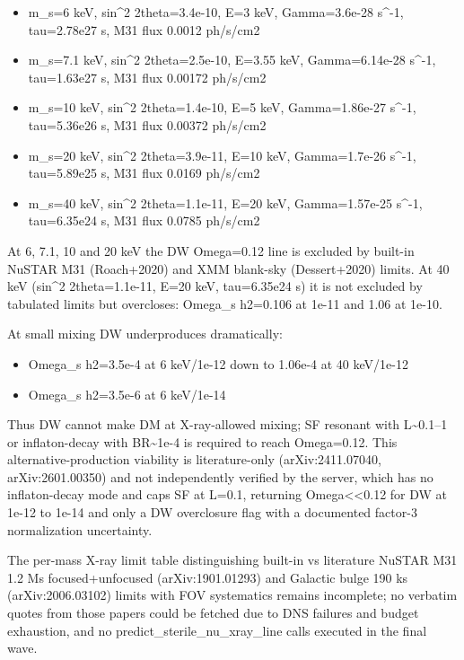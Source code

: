 \documentclass[11pt,a4paper]{article}
\begin{document}
\begin{itemize}
  \item m\_s=6 keV, sin\textasciicircum{}2 2theta=3.4e-10, E=3 keV, Gamma=3.6e-28 s\textasciicircum{}-1, tau=2.78e27 s, M31 flux 0.0012 ph/s/cm2
  \item m\_s=7.1 keV, sin\textasciicircum{}2 2theta=2.5e-10, E=3.55 keV, Gamma=6.14e-28 s\textasciicircum{}-1, tau=1.63e27 s, M31 flux 0.00172 ph/s/cm2
  \item m\_s=10 keV, sin\textasciicircum{}2 2theta=1.4e-10, E=5 keV, Gamma=1.86e-27 s\textasciicircum{}-1, tau=5.36e26 s, M31 flux 0.00372 ph/s/cm2
  \item m\_s=20 keV, sin\textasciicircum{}2 2theta=3.9e-11, E=10 keV, Gamma=1.7e-26 s\textasciicircum{}-1, tau=5.89e25 s, M31 flux 0.0169 ph/s/cm2
  \item m\_s=40 keV, sin\textasciicircum{}2 2theta=1.1e-11, E=20 keV, Gamma=1.57e-25 s\textasciicircum{}-1, tau=6.35e24 s, M31 flux 0.0785 ph/s/cm2
\end{itemize}
At 6, 7.1, 10 and 20 keV the DW Omega=0.12 line is excluded by built-in NuSTAR M31 (Roach+2020) and XMM blank-sky (Dessert+2020) limits. At 40 keV (sin\textasciicircum{}2 2theta=1.1e-11, E=20 keV, tau=6.35e24 s) it is not excluded by tabulated limits but overcloses: Omega\_s h2=0.106 at 1e-11 and 1.06 at 1e-10.

At small mixing DW underproduces dramatically:

\begin{itemize}
  \item Omega\_s h2=3.5e-4 at 6 keV/1e-12 down to 1.06e-4 at 40 keV/1e-12
  \item Omega\_s h2=3.5e-6 at 6 keV/1e-14
\end{itemize}
Thus DW cannot make DM at X-ray-allowed mixing; SF resonant with L\textasciitilde{}0.1--1 or inflaton-decay with BR\textasciitilde{}1e-4 is required to reach Omega=0.12. This alternative-production viability is literature-only (arXiv:2411.07040, arXiv:2601.00350) and not independently verified by the server, which has no inflaton-decay mode and caps SF at L=0.1, returning Omega\textless{}\textless{}0.12 for DW at 1e-12 to 1e-14 and only a DW overclosure flag with a documented factor-3 normalization uncertainty.

The per-mass X-ray limit table distinguishing built-in vs literature NuSTAR M31 1.2 Ms focused+unfocused (arXiv:1901.01293) and Galactic bulge 190 ks (arXiv:2006.03102) limits with FOV systematics remains incomplete; no verbatim quotes from those papers could be fetched due to DNS failures and budget exhaustion, and no predict\_sterile\_nu\_xray\_line calls executed in the final wave.
\end{document}
